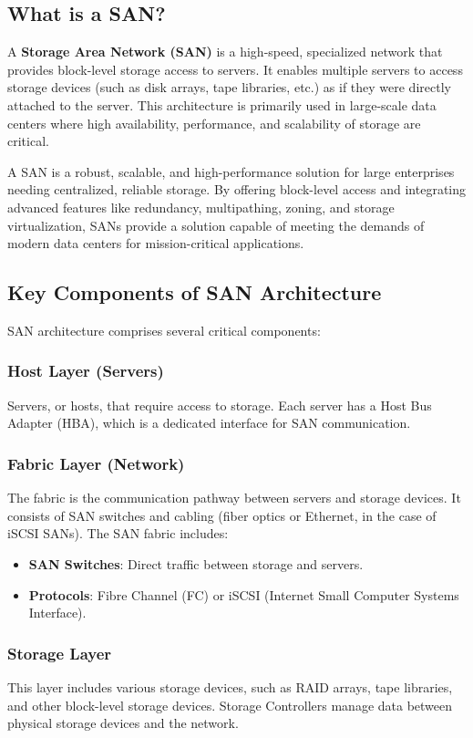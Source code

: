 \documentclass{article}
\begin{document}
\subsection{What is a SAN?}
A \textbf{Storage Area Network (SAN)} is a high-speed, specialized network that provides block-level storage access to servers. It enables multiple servers to access storage devices (such as disk arrays, tape libraries, etc.) as if they were directly attached to the server. This architecture is primarily used in large-scale data centers where high availability, performance, and scalability of storage are critical.

A SAN is a robust, scalable, and high-performance solution for large enterprises needing centralized, reliable storage. By offering block-level access and integrating advanced features like redundancy, multipathing, zoning, and storage virtualization, SANs provide a solution capable of meeting the demands of modern data centers for mission-critical applications.

\subsection{Key Components of SAN Architecture}
SAN architecture comprises several critical components:

\subsubsection{Host Layer (Servers)}
Servers, or hosts, that require access to storage. Each server has a Host Bus Adapter (HBA), which is a dedicated interface for SAN communication.

\subsubsection{Fabric Layer (Network)}
The fabric is the communication pathway between servers and storage devices. It consists of SAN switches and cabling (fiber optics or Ethernet, in the case of iSCSI SANs). The SAN fabric includes:
\begin{itemize}
    \item \textbf{SAN Switches}: Direct traffic between storage and servers.
    \item \textbf{Protocols}: Fibre Channel (FC) or iSCSI (Internet Small Computer Systems Interface).
\end{itemize}

\subsubsection{Storage Layer}
This layer includes various storage devices, such as RAID arrays, tape libraries, and other block-level storage devices. Storage Controllers manage data between physical storage devices and the network.
\end{document}
